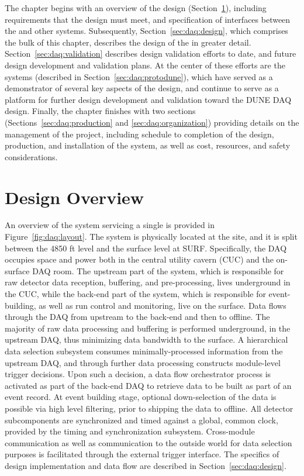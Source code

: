 The chapter begins with an overview of the  design
(Section~\ref{sec:daq:overview}), including requirements that the design must
meet, and specification of interfaces between the  and other
  systems. 
Subsequently, Section~\ref{sec:daq:design}, which comprises the bulk of this
chapter, describes the design of the   in greater detail.
Section~\ref{sec:daq:validation} describes design validation efforts to date,
and future design development and validation plans.
At the center of these efforts are the   systems
(described in Section~\ref{sec:daq:protodune}), which have served as a
demonstrator of several key aspects of the   design, and
continue to serve as a platform for further design development and validation
toward the DUNE DAQ design. 
Finally, the chapter finishes with two sections
(Sections~\ref{sec:daq:production} and \ref{sec:daq:organization})
providing details on the management of the  project, including
schedule to completion of the design, production, and installation of the
system, as well as cost, resources, and safety considerations.

\section{Design Overview}
\label{sec:daq:overview}

An overview of the    system servicing a single
  is provided in Figure~\ref{fig:daq:layout}.
The system is physically located at the  site, and it is split between
the 4850 ft level and the surface level at SURF.
Specifically, the DAQ occupies space and power both in the central utility
cavern (CUC) and the on-surface DAQ room.
The upstream part of the system, which is responsible for raw detector data
reception, buffering, and pre-processing, lives underground in the CUC, while
the back-end part of the system, which is responsible for event-building, as
well as run control and monitoring, live on the surface.
Data flows through the DAQ from upstream to the back-end and then to offline.
The majority of raw data processing and buffering is performed underground, in
the upstream DAQ, thus minimizing data bandwidth to the surface.
A hierarchical data selection subsystem consumes minimally-processed information
from the upstream DAQ, and through further data processing constructs
module-level trigger decisions.
Upon such a decision, a data flow orchestrator process is activated as part of
the back-end DAQ to retrieve data to be built as part of an event record.
At event building stage, optional down-selection of the data is possible via
high level filtering, prior to shipping the data to offline.
All detector subcomponents are synchronized and timed against a global, common
clock, provided by the timing and synchronization subsystem.
Cross-module communication as well as communication to the outside world for
data selection purposes is facilitated through the external trigger interface.
The specifics of design implementation and data flow are described in
Section~\ref{sec:daq:design}.

